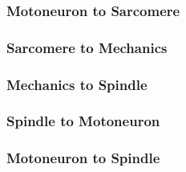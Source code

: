 \subsubsection{Motoneuron to Sarcomere}
\subsubsection{Sarcomere to Mechanics}
\subsubsection{Mechanics to Spindle}
\subsubsection{Spindle to Motoneuron}
\subsubsection{Motoneuron to Spindle}
